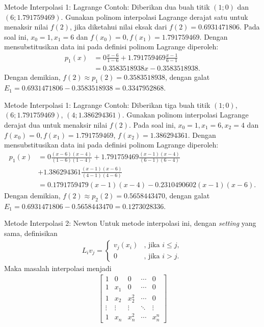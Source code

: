 \documentclass[xcolor={dvipsnames}, 9pt]{beamer}
\begin{document}
    \begin{frame}{Metode Interpolasi 1: Lagrange}
        Contoh: Diberikan dua buah titik $(1;0)$ dan $(6;1.791759469)$. Gunakan polinom interpolasi Lagrange derajat satu untuk menaksir nilai $f(2)$, jika diketahui nilai eksak dari $f(2)=0.6931471806$. \newline
        Pada soal ini, $x_0=1, x_1=6$ dan $f(x_0)=0, f(x_1)=1.791759469$. Dengan mensubstitusikan data ini pada definisi polinom Lagrange diperoleh:
        \begin{align*}
            p_1(x) &= 0\frac{x-6}{1-6} + 1.791759469\frac{x-1}{6-1} \\ &= 0.3583518938x-0.3583518938.
        \end{align*}
        Dengan demikian, $f(2)\approx p_1(2) = 0.3583518938$, dengan galat $E_1 = 0.6931471806-0.3583518938 = 0.3347952868$.
    \end{frame}
    \begin{frame}{Metode Interpolasi 1: Lagrange}
        Contoh: Diberikan tiga buah titik $(1;0)$, $(6;1.791759469)$, $(4;1.386294361)$. Gunakan polinom interpolasi Lagrange derajat dua untuk menaksir nilai $f(2)$. \newline
        Pada soal ini, $x_0=1, x_1=6, x_2=4$ dan $f(x_0)=0, f(x_1)=1.791759469$, $f(x_2) = 1.386294361$. Dengan mensubstitusikan data ini pada definisi polinom Lagrange diperoleh:
        \begin{align*}
            p_1(x) &= 0\frac{(x-6)(x-4)}{(1-6)(1-4)} + 1.791759469\frac{(x-1)(x-4)}{(6-1)(6-4)} \\ &+ 1.386294361\frac{(x-1)(x-6)}{(4-1)(4-6)} \\ &= 0.1791759479(x-1)(x-4)-0.2310490602(x-1)(x-6).
        \end{align*}
        Dengan demikian, $f(2)\approx p_2(2) = 0.5658443470$, dengan galat $E_1 = 0.6931471806-0.5658443470 = 0.1273028336$.
    \end{frame}
    \begin{frame}{Metode Interpolasi 2: Newton}
        Untuk metode interpolasi ini, dengan \textit{setting} yang sama, definisikan
        \begin{align*}
            L_iv_j = \begin{cases}
                v_j(x_i) & \text{, jika } i\leq j, \\
                0 & \text{, jika } i>j.
            \end{cases}
        \end{align*}
        Maka masalah interpolasi menjadi
        \begin{align*}
            \begin{bmatrix}
                1 & 0 & 0 & \cdots & 0 \\
                1 & x_1 & 0 & \cdots & 0 \\
                1 & x_2 & x_2^2 & \cdots & 0 \\
                \vdots & \vdots & \vdots & \ddots & \vdots \\
                1 & x_n & x_n^2 & \cdots & x_n^n
            \end{bmatrix}
        \end{align*}
    \end{frame}
\end{document}
